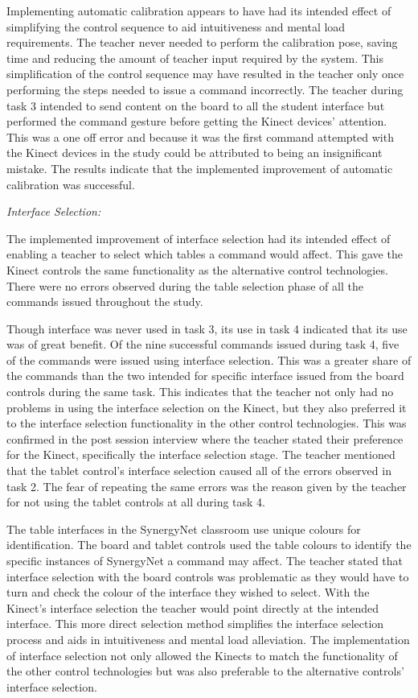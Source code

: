 \documentclass[link]{IWCOMP}
\begin{document}
Implementing automatic calibration appears to have had its intended effect of simplifying the control sequence to aid intuitiveness and mental load requirements.
The teacher never needed to perform the calibration pose, saving time and reducing the amount of teacher input required by the system.
This simplification of the control sequence may have resulted in the teacher only once performing the steps needed to issue a command incorrectly.
The teacher during task 3 intended to send content on the board to all the student interface but performed the command gesture before getting the Kinect devices' attention.
This was a one off error and because it was the first command attempted with the Kinect devices in the study could be attributed to being an insignificant mistake.
The results indicate that the implemented improvement of automatic calibration was successful.

\emph{Interface Selection:}

The implemented improvement of interface selection had its intended effect of enabling a teacher to select which tables a command would affect.
This gave the Kinect controls the same functionality as the alternative control technologies.
There were no errors observed during the table selection phase of all the commands issued throughout the study.

Though interface was never used in task 3, its use in task 4 indicated that its use was of great benefit.
Of the nine successful commands issued during task 4, five of the commands were issued using interface selection.
This was a greater share of the commands than the two intended for specific interface issued from the board controls during the same task.
This indicates that the teacher not only had no problems in using the interface selection on the Kinect, but they also preferred it to the interface selection functionality in the other control technologies.
This was confirmed in the post session interview where the teacher stated their preference for the Kinect, specifically the interface selection stage.
The teacher mentioned that the tablet control's interface selection caused all of the errors observed in task 2.
The fear of repeating the same errors was the reason given by the teacher for not using the tablet controls at all during task 4.

The table interfaces in the SynergyNet classroom use unique colours for identification.
The board and tablet controls used the table colours to identify the specific instances of SynergyNet a command may affect.
The teacher stated that interface selection with the board controls was problematic as they would have to turn and check the colour of the interface they wished to select.
With the Kinect's interface selection the teacher would point directly at the intended interface.
This more direct selection method simplifies the interface selection process and aids in intuitiveness and mental load alleviation.
The implementation of interface selection not only allowed the Kinects to match the functionality of the other control technologies but was also preferable to the alternative controls' interface selection.
\end{document}
